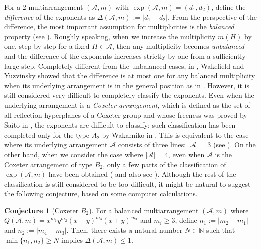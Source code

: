 \documentclass[12pt]{amsart}
\theoremstyle{definition}
\newtheorem{remark}[definition]{Remark}
\newtheorem{conjecture}[definition]{Conjecture}
\newcommand{\NN}{\mathbb{N}}
\newcommand{\AAA}{\mathcal{A}}
\newcommand{\red}[1]{\textcolor{red}{#1}}
\begin{document}
For a $2$-multiarrangement $(\AAA,m)$ 
with $\exp(\AAA,m)=(d_1,d_2)$, define 
the \emph{difference} of the exponents as $\Delta(\AAA,m):=|d_1-d_2|$. 
From the perspective of the difference, 
the most important assumption for multiplicities is the \emph{balanced} property 
(see ). 
%
Roughly speaking, when we increase the multiplicity $m(H)$ by one, step by step 
for a fixed $H\in\AAA$, 
then any multiplicity becomes \emph{unbalanced} and 
the difference of the exponents increases strictly by one 
from a sufficiently large step. 
Completely different from the unbalanced cases, 
%
in \cite{Wakefield-Yuzvinsky}, Wakefield and Yuzvinsky showed that 
the difference is at most one 
for any balanced multiplicity 
when its underlying arrangement is in the general position 
as in . 
However, it is still considered very difficult to completely classify the exponents. 
Even when the underlying arrangement %
is %
a \emph{Coxeter arrangement}, 
which is defined as the set of all reflection hyperplanes of a Coxeter group 
and whose freeness was proved by Saito in \cite{Saito}, 
the exponents are difficult to classify; %
such classification has been completed %
only for the type $A_2$ 
by Wakamiko in \cite{Wakamiko}. 
This is equivalent to 
the case where its underlying arrangement $\AAA$ consists of three lines: $|\AAA|=3$ (see ). 
On the other hand, 
when we consider the case where $|\AAA|=4$, 
even when $\AAA$ is 
the Coxeter arrangement of type $B_2$, 
only a few parts of the classification of $\exp(\AAA,m)$ 
have been obtained 
(\cite{Wakamiko:universal,2312.06356} and also see ). 
Although the rest of the classification is still considered to be 
too difficult, 
it might be natural to suggest the following conjecture, 
based on some computer calculations. %
\begin{conjecture}[Coxeter $B_2$]\label{conjecture:B_2 exponents large enough}
    For a balanced multiarrangement $(\AAA,m)$ 
    where $Q(\AAA,m)=x^{m_1}y^{m_2}(x-y)^{m_3}(x+y)^{m_4}$ 
    and %
    $m_i\geq3$, 
    define $n_1:=|m_2-m_1|$ and $n_2:=|m_4-m_3|$. 
    Then, %
    there exists a natural number $N\in\NN$ such that 
    $\min\{n_1, n_2\}\geq N$ implies $\Delta(\AAA,m)\leq1$. 
\end{conjecture}
\end{document}

